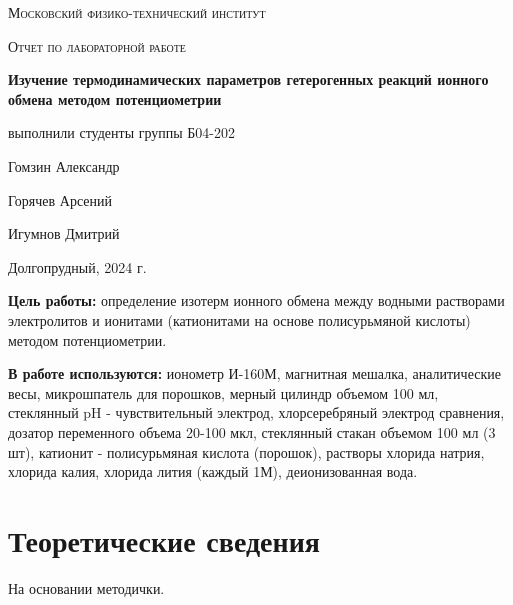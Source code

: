 \documentclass[a4paper]{article}
\begin{document}
\begin{titlepage}
	\centering
	\vspace{5cm}
	{\scshape\LARGE Московский физико-технический институт \par}
	\vspace{4cm}
	{\scshape\Large Отчет по лабораторной работе  \par}
	\vspace{1cm}
	{\huge\bfseries Изучение термодинамических параметров гетерогенных реакций ионного обмена методом потенциометрии \par}
	\vspace{1cm}
	\vfill
\begin{flushright}
	{\large выполнили студенты группы Б04-202}\par
	\vspace{0.3cm}
	{\LARGE Гомзин Александр} \par
		\vspace{0.3cm}
	{\LARGE Горячев Арсений} \par
        \vspace{0.3cm}
        {\LARGE Игумнов Дмитрий} \par
\end{flushright}
	

	\vfill

	Долгопрудный, 2024 г.
\end{titlepage}

	\thispagestyle{empty} %


	\newpage \large
	
		\tableofcontents %
	
	\newpage
\par
	\large \textbf{Цель работы:}  определение изотерм ионного обмена между водными растворами электролитов 
и ионитами (катионитами на основе полисурьмяной кислоты) методом потенциометрии.
	\par \vspace{0.3 cm}
	\textbf{В работе используются:} ионометр И-160М, магнитная мешалка, аналитические весы, микрошпатель для порошков, мерный цилиндр объемом 100 мл, стеклянный pH - чувствительный электрод, хлорсеребряный электрод сравнения, дозатор переменного объема 20-100 мкл, стеклянный стакан объемом 100 мл (3 шт), катионит - полисурьмяная кислота (порошок), растворы хлорида натрия, хлорида калия, хлорида лития (каждый 1М), деионизованная вода.

	\section{Теоретические сведения}
На основании методички. \par
\end{document}
